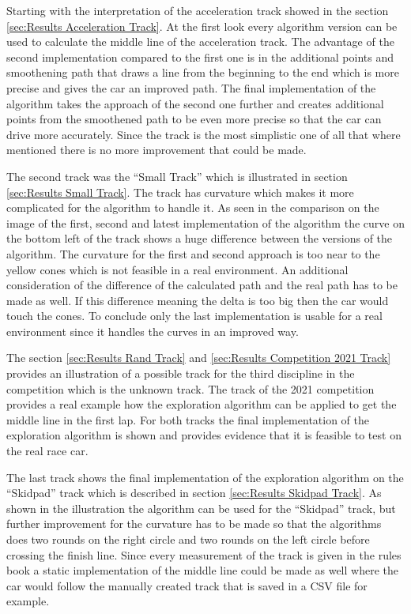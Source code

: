 Starting with the interpretation of the acceleration track showed in the section \ref{sec:Results Acceleration Track}. At the first look every algorithm version can be used to calculate the middle line of the acceleration track. The advantage of the second implementation compared to the first one is in the additional points and smoothening path that draws a line from the beginning to the end which is more precise and gives the car an improved path. The final implementation of the algorithm takes the approach of the second one further and creates additional points from the smoothened path to be even more precise so that the car can drive more accurately. Since the track is the most simplistic one of all that where mentioned there is no more improvement that could be made.

The second track was the ``Small Track'' which is illustrated in section \ref{sec:Results Small Track}. The track has curvature which makes it more complicated for the algorithm to handle it. As seen in the comparison on the image of the first, second and latest implementation of the algorithm the curve on the bottom left of the track shows a huge difference between the versions of the algorithm. The curvature for the first and second approach is too near to the yellow cones which is not feasible in a real environment. An additional consideration of the difference of the calculated path and the real path has to be made as well. If this difference meaning the delta is too big then the car would touch the cones. To conclude only the last implementation is usable for a real environment since it handles the curves in an improved way.

The section \ref{sec:Results Rand Track} and \ref{sec:Results Competition 2021 Track} provides an illustration of a possible track for the third discipline in the competition which is the unknown track. The track of the 2021 competition provides a real example how the exploration algorithm can be applied to get the middle line in the first lap. For both tracks the final implementation of the exploration algorithm is shown and provides evidence that it is feasible to test on the real race car.

The last track shows the final implementation of the exploration algorithm on the ``Skidpad'' track which is described in section \ref{sec:Results Skidpad Track}. As shown in the illustration the algorithm can be used for the ``Skidpad'' track, but further improvement for the curvature has to be made so that the algorithms does two rounds on the right circle and two rounds on the left circle before crossing the finish line. Since every measurement of the track is given in the rules book a static implementation of the middle line could be made as well where the car would follow the manually created track that is saved in a CSV file for example.

